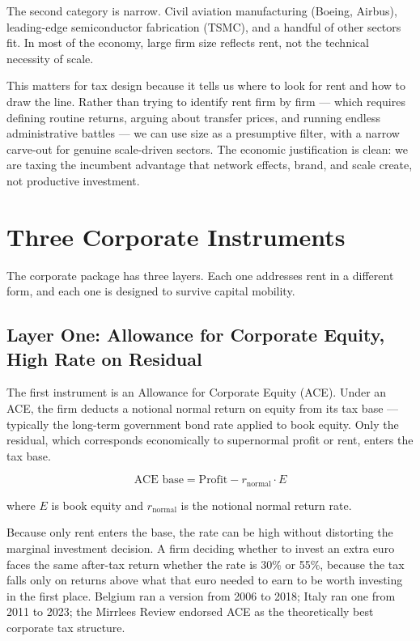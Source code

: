 \documentclass[11pt,a4paper]{article}
\begin{document}
The second category is narrow. Civil aviation manufacturing (Boeing, Airbus), leading-edge semiconductor fabrication (TSMC), and a handful of other sectors fit. In most of the economy, large firm size reflects rent, not the technical necessity of scale.

This matters for tax design because it tells us where to look for rent and how to draw the line. Rather than trying to identify rent firm by firm — which requires defining routine returns, arguing about transfer prices, and running endless administrative battles — we can use size as a presumptive filter, with a narrow carve-out for genuine scale-driven sectors. The economic justification is clean: we are taxing the incumbent advantage that network effects, brand, and scale create, not productive investment.

\section{Three Corporate Instruments}

The corporate package has three layers. Each one addresses rent in a different form, and each one is designed to survive capital mobility.

\subsection{Layer One: Allowance for Corporate Equity, High Rate on Residual}

The first instrument is an Allowance for Corporate Equity (ACE). Under an ACE, the firm deducts a notional normal return on equity from its tax base — typically the long-term government bond rate applied to book equity. Only the residual, which corresponds economically to supernormal profit or rent, enters the tax base.

\[
\text{ACE base} = \text{Profit} - r_{\text{normal}} \cdot E
\]

where $E$ is book equity and $r_{\text{normal}}$ is the notional normal return rate.

Because only rent enters the base, the rate can be high without distorting the marginal investment decision. A firm deciding whether to invest an extra euro faces the same after-tax return whether the rate is 30\% or 55\%, because the tax falls only on returns above what that euro needed to earn to be worth investing in the first place. Belgium ran a version from 2006 to 2018; Italy ran one from 2011 to 2023; the Mirrlees Review endorsed ACE as the theoretically best corporate tax structure.
\end{document}
